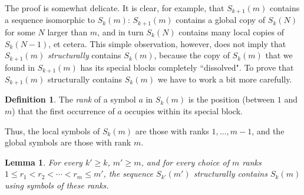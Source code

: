 \documentclass[11pt]{article}
\newtheorem{lemma}[theorem]{Lemma}
\theoremstyle{definition}
\newtheorem{definition}[theorem]{Definition}
\theoremstyle{remark}
\begin{document}
The proof is somewhat delicate. It is clear, for example, that $S_{k+1}(m)$ contains a sequence isomorphic to $S_k(m)$: $S_{k+1}(m)$ contains a global copy of $S_k(N)$ for some $N$ larger than $m$, and in turn $S_k(N)$ contains many local copies of $S_k(N-1)$, et cetera. This simple observation, however, does not imply that $S_{k+1}(m)$ \emph{structurally} contains $S_k(m)$, because the copy of $S_k(m)$ that we found in $S_{k+1}(m)$ has its special blocks completely ``dissolved". To prove that $S_{k+1}(m)$ structurally contains $S_k(m)$ we have to work a bit more carefully.

\begin{definition}\label{def_rank}
The \emph{rank} of a symbol $a$ in $S_k(m)$ is the position (between $1$ and $m$) that the first occurrence of $a$ occupies within its special block.
\end{definition}

Thus, the local symbols of $S_k(m)$ are those with ranks $1,\ldots,m-1$, and the global symbols are those with rank $m$.

\begin{lemma}\label{lem_structurally}
For every $k'\ge k$, $m'\ge m$, and for every choice of $m$ ranks $1\le r_1 < r_2 < \cdots < r_m \le m'$, the sequence $S_{k'}(m')$ structurally contains $S_k(m)$ using symbols of these ranks.
\end{lemma}
\end{document}
